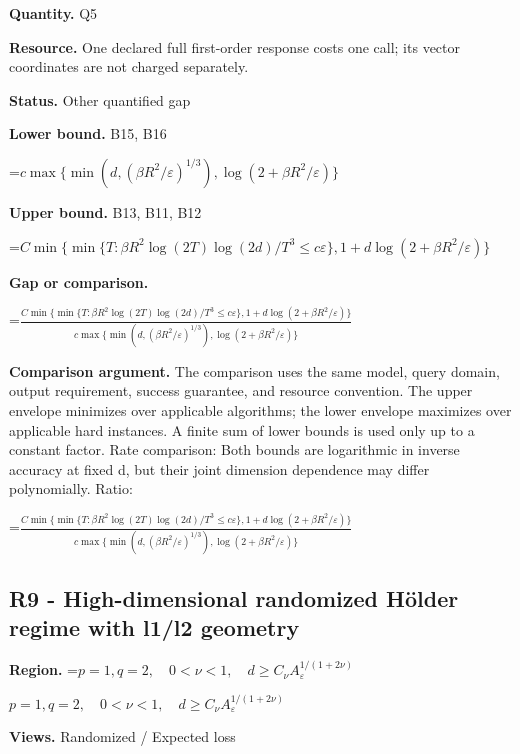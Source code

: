 \documentclass[10pt,a4paper]{article}
\newcommand{\AtlasMath}[1]{\par\begingroup\centering\setbox0=\hbox{$\displaystyle #1$}\ifdim\wd0>1.4\linewidth\typeout{ATLAS WIDE FORMULA: \the\wd0}\fi\ifdim\wd0>\linewidth\resizebox{\linewidth}{!}{\box0}\else\box0\fi\par\endgroup}
\newcommand{\AtlasInlineMath}[1]{\begingroup\setbox0=\hbox{$#1$}\ifdim\wd0>.4\linewidth\endgroup\AtlasMath{#1}\else\endgroup$#1$\fi}
\begin{document}
\textbf{Quantity.} Q5



\textbf{Resource.} One declared full first-order response costs one call; its vector coordinates are not charged separately.



\textbf{Status.} Other quantified gap



\textbf{Lower bound.} B15, B16



\AtlasMath{c\max\{\min(d,(\beta R^2/\varepsilon)^{1/3}),\log(2+\beta R^2/\varepsilon)\}}


\textbf{Upper bound.} B13, B11, B12



\AtlasMath{C\min\{\min\{T:\beta R^2\log(2T)\log(2d)/T^3\le c\varepsilon\},1+d\log(2+\beta R^2/\varepsilon)\}}


\textbf{Gap or comparison.}
\AtlasMath{\frac{C\min\{\min\{T:\beta R^2\log(2T)\log(2d)/T^3\le c\varepsilon\},1+d\log(2+\beta R^2/\varepsilon)\}}{c\max\{\min(d,(\beta R^2/\varepsilon)^{1/3}),\log(2+\beta R^2/\varepsilon)\}}}




\textbf{Comparison argument.} The comparison uses the same model, query domain, output requirement, success guarantee, and resource convention. The upper envelope minimizes over applicable algorithms; the lower envelope maximizes over applicable hard instances. A finite sum of lower bounds is used only up to a constant factor. Rate comparison: Both bounds are logarithmic in inverse accuracy at fixed d, but their joint dimension dependence may differ polynomially. Ratio:
\AtlasMath{\frac{C\min\{\min\{T:\beta R^2\log(2T)\log(2d)/T^3\le c\varepsilon\},1+d\log(2+\beta R^2/\varepsilon)\}}{c\max\{\min(d,(\beta R^2/\varepsilon)^{1/3}),\log(2+\beta R^2/\varepsilon)\}}}




\subsection{R9 - High-dimensional randomized Hölder regime with l1/l2 geometry}


\textbf{Region.} \AtlasInlineMath{p=1,q=2,\quad0<\nu<1,\quad d\ge C_\nu A_\varepsilon^{1/(1+2\nu)}}



\textbf{Views.} Randomized / Expected loss
\end{document}
